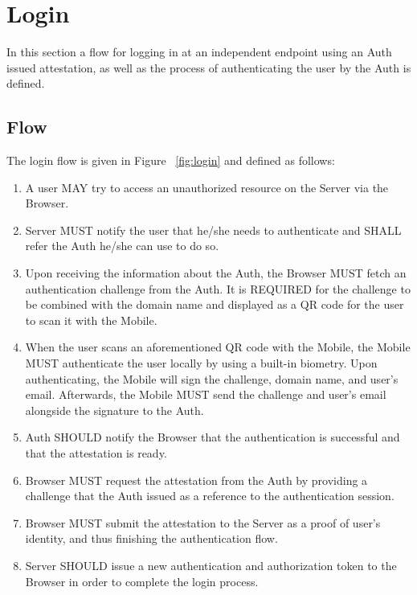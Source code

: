 \section{Login}
In this section a flow for logging in at an independent endpoint using an Auth issued attestation, as well as the 
process of authenticating the user by the Auth is defined. 

    \subsection{Flow}
    The login flow is given in Figure ~\ref{fig:login} and defined as follows:
        \begin{enumerate}
            \item A user MAY try to access an unauthorized resource on the Server via the Browser.
            \item Server MUST notify the user that he/she needs to authenticate and SHALL refer the Auth he/she 
                  can use to do so.
            \item Upon receiving the information about the Auth, the Browser MUST fetch an authentication challenge
                  from the Auth. It is REQUIRED for the challenge to be combined with the domain name and
                  displayed as a QR code for the user to scan it with the Mobile.
            \item When the user scans an aforementioned QR code with the Mobile, the Mobile MUST authenticate the 
                  user locally by using a built-in biometry. Upon authenticating, the Mobile will sign the 
                  challenge, domain name, and user's email. Afterwards, the Mobile MUST send the challenge and user's
                  email alongside the signature to the Auth.
            \item Auth SHOULD notify the Browser that the authentication is successful and that the attestation is
                  ready.
            \item Browser MUST request the attestation from the Auth by providing a challenge that the Auth issued 
                  as a reference to the authentication session.
            \item Browser MUST submit the attestation to the Server as a proof of user's identity, and thus finishing 
                  the authentication flow.
            \item Server SHOULD issue a new authentication and authorization token to the Browser in order to complete
                  the login process.
        \end{enumerate}
        


